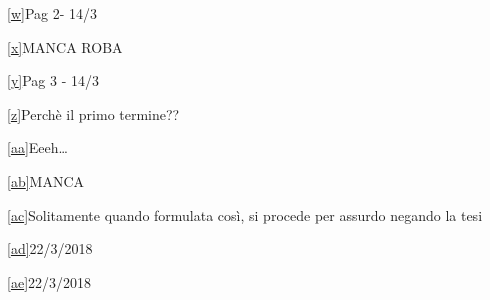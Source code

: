 \documentclass{article}
\begin{document}
\protect\hyperlink{cmnt_ref23}{{[}w{]}}{Pag 2- 14/3}

\protect\hyperlink{cmnt_ref24}{{[}x{]}}{MANCA ROBA}

\protect\hyperlink{cmnt_ref25}{{[}y{]}}{Pag 3 - 14/3}

\protect\hyperlink{cmnt_ref26}{{[}z{]}}{Perchè il primo termine??}

\protect\hyperlink{cmnt_ref27}{{[}aa{]}}{Eeeh\ldots{}}

\protect\hyperlink{cmnt_ref28}{{[}ab{]}}{MANCA}

\protect\hyperlink{cmnt_ref29}{{[}ac{]}}{Solitamente quando formulata
così, si procede per assurdo negando la tesi}

\protect\hyperlink{cmnt_ref30}{{[}ad{]}}{22/3/2018}

\protect\hyperlink{cmnt_ref31}{{[}ae{]}}{22/3/2018}
\end{document}
